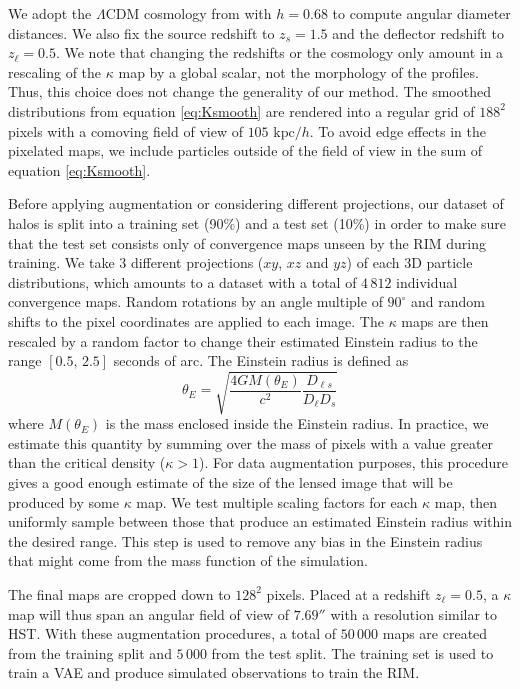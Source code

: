 We adopt the $\Lambda$CDM cosmology from 
\citet{PlanckCollaboration2018} with $h=0.68$ to compute 
angular diameter distances. We also fix the 
source redshift to $z_s=1.5$ and the deflector redshift to $z_\ell=0.5$. 
We note that changing the redshifts or the cosmology 
only amount in a rescaling of the $\kappa$ map by a global scalar, not 
the morphology of the profiles. Thus, this choice does not change the generality of our method.
The smoothed distributions from equation \eqref{eq:Ksmooth} are 
rendered into a regular grid of $188^2$ pixels with a comoving field of view of $105\,\,\mathrm{kpc}/h$. 
To avoid 
edge effects in the pixelated maps, 
we include particles outside of the field of view in the sum of equation \eqref{eq:Ksmooth}.
\par
Before applying augmentation or considering different projections, our dataset of halos is split into a 
training set (90\%) and a test set (10\%) in order to make sure that the test set consists only 
of convergence maps unseen by the RIM during training.
We take 3 different projections ($xy$, $xz$ and $yz$) of each 3D particle 
distributions, which amounts to a dataset with a total of $4\,812$ individual convergence maps. 
Random rotations by an angle multiple of $90^{\circ}$ and random shifts to the pixel coordinates 
are applied to each image. The $\kappa$ maps are then rescaled by a random factor to change their 
estimated Einstein radius to the range 
$[0.5,\,2.5]$ seconds of arc.
The Einstein radius is defined as
\begin{equation}\label{eq:ThetaE}
        \theta_E = \sqrt{\frac{4GM(\theta_E)}{c^ 2} \frac{D_{\ell s}}{D_\ell D_s}}
\end{equation} 
where $M(\theta_E)$ is the mass enclosed inside the Einstein radius. In practice, we estimate this quantity 
by summing over the mass of pixels with a value greater than the critical density ($\kappa > 1$). 
For data augmentation purposes, this procedure gives a good enough estimate of the 
size of the lensed image that will be produced by some $\kappa$ map. 
We test multiple scaling factors for each $\kappa$ map, then uniformly sample between those that produce an estimated 
Einstein radius within the 
desired range. This step is used to remove any bias in the Einstein radius that might come from the mass function 
of the simulation.

The final maps are cropped down to $128^2$ pixels.
Placed at a redshift $z_\ell=0.5$, a $\kappa$ map will thus span an angular field of view of $7.69''$ with 
a resolution similar to HST. 
With these augmentation procedures, a total of $50\,000$ maps are created from the training split and 
$5\,000$ from the test split.
The training set is used to train a VAE and produce simulated observations 
to train the RIM. 

